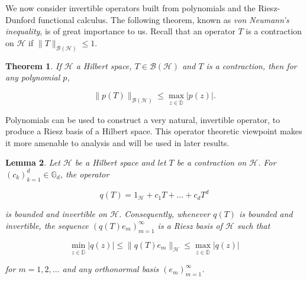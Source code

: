 \documentclass[10pt, reqno]{amsart}
\newtheorem{theorem}{Theorem}[section]
\newtheorem{lemma}[theorem]{Lemma}
\theoremstyle{definition}
\numberwithin{equation}{section}
\begin{document}
We now consider invertible operators built from polynomials and the Riesz-Dunford functional calculus. The following theorem, known as {\it{von Neumann's inequality}}, is of great importance to us. Recall that an operator $T$ is a contraction on $\mathcal{H}$ if $\|T\|_{\mathcal{B}(\mathcal{H})}\leq 1$.

\begin{theorem}{}\label{SchurNeumann}
If $\mathcal{H}$ a Hilbert space, $T\in{\mathcal{B}(\mathcal{H})}$ and $T$ is a contraction, then for any polynomial $p$,

$$ \| p(T) \|_{\mathcal{B}(\mathcal{H})} \leq \max_{z\in\overline{\mathbb{D}}}\lvert p(z)\rvert.$$

\end{theorem} 

Polynomials can be used to construct a very natural, invertible operator, to produce a Riesz basis of a Hilbert space. This operator theoretic viewpoint makes it more amenable to analysis and will be used in later results.

\begin{lemma}\label{invertibleoperator}
Let $\mathcal{H}$ be a Hilbert space and let $T$ be a contraction on $\mathcal{H}$. For $(c_{k})_{k=1}^{d}\in\mathbb{G}_{d}$, the operator
 
 $$q(T)=1_{\mathcal{H}}+c_{1}T+\hdots+c_{d}T^{d}$$ 
 
\noindent is bounded and invertible on $\mathcal{H}$. Consequently, whenever
$q(T)$ is bounded and invertible, the sequence $(q(T)e_{m})_{m=1}^{\infty}$ is a Riesz basis of $\mathcal{H}$ such that

\begin{equation}\label{inequalityriesz}
    \min_{z\in\overline{\mathbb{D}}}|q(z)| \leq \|q(T)e_{m}\|_{\mathcal{H}}\leq \max_{z\in\overline{\mathbb{D}}}|q(z)|
\end{equation}

\noindent for $m=1,2,\hdots$ and any orthonormal basis $(e_{m})_{m=1}^{\infty}$. 

\end{lemma}
\end{document}

